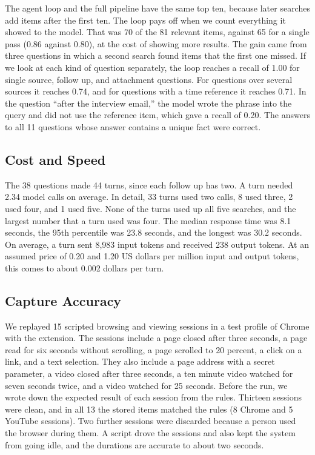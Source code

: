 \documentclass[conference]{IEEEtran}
\begin{document}
The agent loop and the full pipeline have the same top ten, because later searches add items after the first ten. The loop pays off when we count everything it showed to the model. That was 70 of the 81 relevant items, against 65 for a single pass (0.86 against 0.80), at the cost of showing more results. The gain came from three questions in which a second search found items that the first one missed. If we look at each kind of question separately, the loop reaches a recall of 1.00 for single source, follow up, and attachment questions. For questions over several sources it reaches 0.74, and for questions with a time reference it reaches 0.71. In the question ``after the interview email,'' the model wrote the phrase into the query and did not use the reference item, which gave a recall of 0.20. The answers to all 11 questions whose answer contains a unique fact were correct.

\subsection{Cost and Speed}
The 38 questions made 44 turns, since each follow up has two. A turn needed 2.34 model calls on average. In detail, 33 turns used two calls, 8 used three, 2 used four, and 1 used five. None of the turns used up all five searches, and the largest number that a turn used was four. The median response time was 8.1 seconds, the 95th percentile was 23.8 seconds, and the longest was 30.2 seconds. On average, a turn sent 8,983 input tokens and received 238 output tokens. At an assumed price of 0.20 and 1.20 US dollars per million input and output tokens, this comes to about 0.002 dollars per turn.

\subsection{Capture Accuracy}
We replayed 15 scripted browsing and viewing sessions in a test profile of Chrome with the extension. The sessions include a page closed after three seconds, a page read for six seconds without scrolling, a page scrolled to 20 percent, a click on a link, and a text selection. They also include a page address with a secret parameter, a video closed after three seconds, a ten minute video watched for seven seconds twice, and a video watched for 25 seconds. Before the run, we wrote down the expected result of each session from the rules. Thirteen sessions were clean, and in all 13 the stored items matched the rules (8 Chrome and 5 YouTube sessions). Two further sessions were discarded because a person used the browser during them. A script drove the sessions and also kept the system from going idle, and the durations are accurate to about two seconds.
\end{document}
